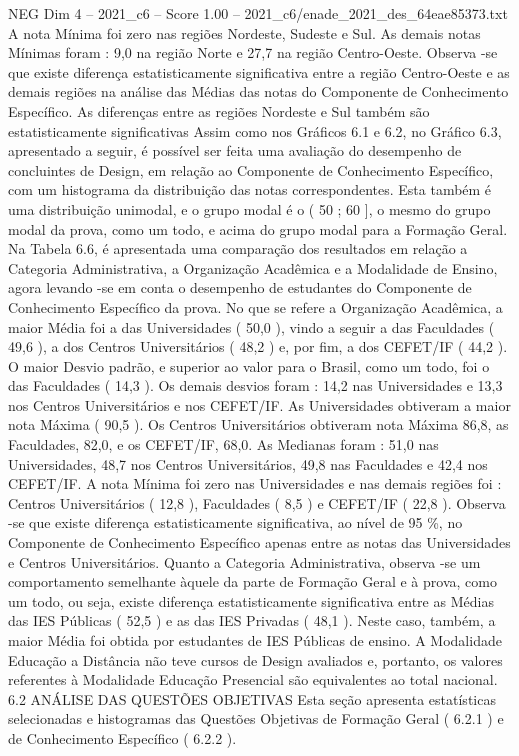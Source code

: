 \begin{textsample}{NEG Dim 4 – 2021\_c6 – Score 1.00 – 2021\_c6/enade\_2021\_des\_64eae85373.txt}
A nota Mínima foi zero nas regiões Nordeste, Sudeste e Sul.
As demais notas Mínimas foram : 9,0 na região Norte e 27,7 na região Centro-Oeste.
Observa -se que existe diferença estatisticamente significativa entre a região Centro-Oeste e as demais regiões na análise das Médias das notas do Componente de Conhecimento Específico.
As diferenças entre as regiões Nordeste e Sul também são estatisticamente significativas Assim como nos Gráficos 6.1 e 6.2, no Gráfico 6.3, apresentado a seguir, é possível ser feita uma avaliação do desempenho de concluintes de Design, em relação ao Componente de Conhecimento Específico, com um histograma da distribuição das notas correspondentes.
Esta também é uma distribuição unimodal, e o grupo modal é o ( 50 ; 60 ], o mesmo do grupo modal da prova, como um todo, e acima do grupo modal para a Formação Geral.
Na Tabela 6.6, é apresentada uma comparação dos resultados em relação a Categoria Administrativa, a Organização Acadêmica e a Modalidade de Ensino, agora levando -se em conta o desempenho de estudantes do Componente de Conhecimento Específico da prova.
No que se refere a Organização Acadêmica, a maior Média foi a das Universidades ( 50,0 ), vindo a seguir a das Faculdades ( 49,6 ), a dos Centros Universitários ( 48,2 ) e, por fim, a dos CEFET/IF ( 44,2 ).
O maior Desvio padrão, e superior ao valor para o Brasil, como um todo, foi o das Faculdades ( 14,3 ).
Os demais desvios foram : 14,2 nas Universidades e 13,3 nos Centros Universitários e nos CEFET/IF.
As Universidades obtiveram a maior nota Máxima ( 90,5 ).
Os Centros Universitários obtiveram nota Máxima 86,8, as Faculdades, 82,0, e os CEFET/IF, 68,0.
As Medianas foram : 51,0 nas Universidades, 48,7 nos Centros Universitários, 49,8 nas Faculdades e 42,4 nos CEFET/IF.
A nota Mínima foi zero nas Universidades e nas demais regiões foi : Centros Universitários ( 12,8 ), Faculdades ( 8,5 ) e CEFET/IF ( 22,8 ).
Observa -se que existe diferença estatisticamente significativa, ao nível de 95 \%, no Componente de Conhecimento Específico apenas entre as notas das Universidades e Centros Universitários.
Quanto a Categoria Administrativa, observa -se um comportamento semelhante àquele da parte de Formação Geral e à prova, como um todo, ou seja, existe diferença estatisticamente significativa entre as Médias das IES Públicas ( 52,5 ) e as das IES Privadas ( 48,1 ).
Neste caso, também, a maior Média foi obtida por estudantes de IES Públicas de ensino.
A Modalidade Educação a Distância não teve cursos de Design avaliados e, portanto, os valores referentes à Modalidade Educação Presencial são equivalentes ao total nacional. 6.2 ANÁLISE DAS QUESTÕES OBJETIVAS Esta seção apresenta estatísticas selecionadas e histogramas das Questões Objetivas de Formação Geral ( 6.2.1 ) e de Conhecimento Específico ( 6.2.2 ).

\end{textsample}
